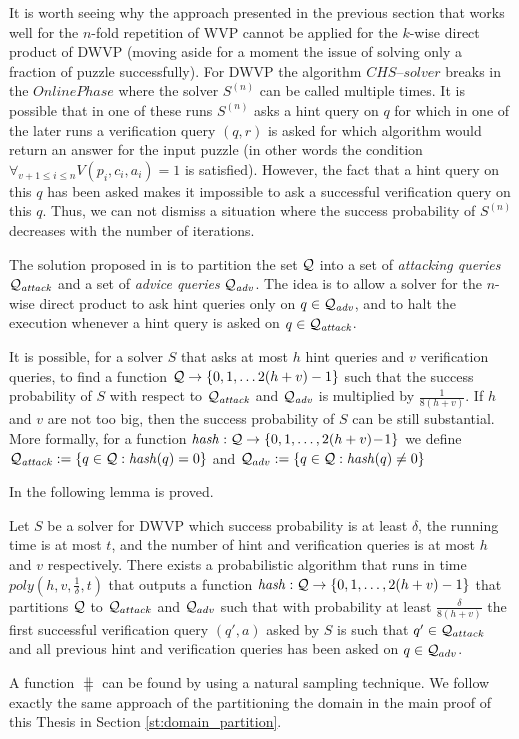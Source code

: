 It is worth seeing why the approach presented in the previous section that works well for the $n$-fold repetition of WVP
cannot be applied for the $k$-wise direct product of DWVP (moving aside for a moment the issue of solving only a fraction of puzzle successfully).
For DWVP the algorithm $\mathit{CHS\text{--}solver}$ breaks in the $\mathit{OnlinePhase}$ where
the solver $S^{(n)}$ can be called multiple times.
It is possible that in one of these runs $S^{(n)}$ asks a hint query on $q$
for which in one of the later runs a verification query $(q,r)$ is asked
for which algorithm would return an answer for the input puzzle
(in other words the condition $\forall_{v+1 \leq i \leq n} V(p_i, c_i, a_i) = 1$ is satisfied).
However, the fact that a hint query on this $q$ has been asked makes it impossible to ask a successful verification query on this $q$.
Thus, we can not dismiss a situation where the success probability of $S^{(n)}$ decreases with the number of iterations.

The solution proposed in \cite{Dodis:2009:SAI:1530441.1530450} is to partition the set $\mathcal{Q}$ into a set of \textit{attacking queries} $\mathcal{Q}_{\mathit{attack}}$
and a set of \textit{advice queries} $\mathcal{Q}_{\mathit{adv}}$. The idea is to allow a solver for the $n$-wise direct product to ask hint
queries only on $q \in \mathcal{Q}_{\mathit{adv}}$, and to halt the execution whenever a hint query is asked on $q \in \mathcal{Q}_{\mathit{attack}}$.

It is possible, for a solver $S$ that asks at most $h$ hint queries and $v$ verification queries,
to find a function $\mathcal{Q} \rightarrow \{0,1,\dotsc 2(h+v)-1\}$ such that the success probability of $S$ with respect to
$\mathcal{Q}_{\mathit{attack}}$ and $\mathcal{Q}_{\mathit{adv}}$ is multiplied by $\frac{1}{8(h+v)}$.
If $h$ and $v$ are not too big, then the success probability of $S$ can be still substantial.
More formally, for a function $\operatorname{\mathit{hash}}:\mathcal{Q} \rightarrow \{0,1,\dotsc, 2(h+v)\!-\!1 \}$
we define $\mathcal{Q}_{\mathit{attack}} := \{q \in \mathcal{Q} : \operatorname{\mathit{hash}}(q) = 0 \}$ and $\mathcal{Q}_{adv} := \{q \in \mathcal{Q}: \operatorname{\mathit{hash}}(q) \neq 0\}$

In \cite{Dodis:2009:SAI:1530441.1530450} the following lemma is proved.
\begin{lemma}
  \label{lemma:hash_function_previous}
Let $S$ be a solver for DWVP which success probability is at least $\delta$, the running time is at most $t$,
and the number of hint and verification queries is at most $h$ and $v$ respectively.
There exists a probabilistic algorithm that runs in time $poly(h,v,\frac{1}{\delta},t)$
that outputs a function $\operatorname{\mathit{hash}} : \mathcal{Q} \rightarrow \{0,1, \dotsc, 2(h+v)-1\}$
that partitions $\mathcal{Q}$ to $\mathcal{Q}_{attack}$ and $\mathcal{Q}_{adv}$ such that
with probability at least $\frac{\delta}{8(h+v)}$ the first successful verification query $(q',a)$ asked by $S$ is such that $q' \in \mathcal{Q}_{attack}$
and all previous hint and verification queries has been asked on $q \in \mathcal{Q}_{adv}$.
\end{lemma}
A function $\hash$ can be found by using a natural sampling technique.
We follow exactly the same approach of the partitioning the domain in the main proof of this Thesis in Section \ref{st:domain_partition}.

